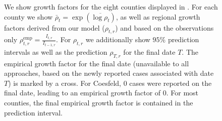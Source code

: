 \begin{figure}
   \resizebox{\textwidth}{!}{%
        
}
    \caption{We show growth factors for the eight counties displayed in . For each county we show $\bar \rho_{t} = \exp \left( \overline{\log\rho_{t}} \right)$, as well as regional growth factors derived from our model ($\rho_{t, r}$) and based on the observations only $\rho^{\text{emp}}_{t, r} = \frac{I_{t,r}}{I_{t - 1, r}}$. For $\rho_{t,r}$ we additionally show $95\%$ prediction intervals as well as the prediction $\rho_{T,r}$ for the final date $T$. The empirical growth factor for the final date (unavailable to all approaches, based on the newly reported cases associated with date $T$) is marked by a cross. For Coesfeld, $0$ cases were reported on the final date, leading to an empirical growth factor of $0$. For most counties, the final empirical growth factor is contained in the prediction interval.}
    \label{fig:regional_showcase_guetersloh}
\end{figure}
